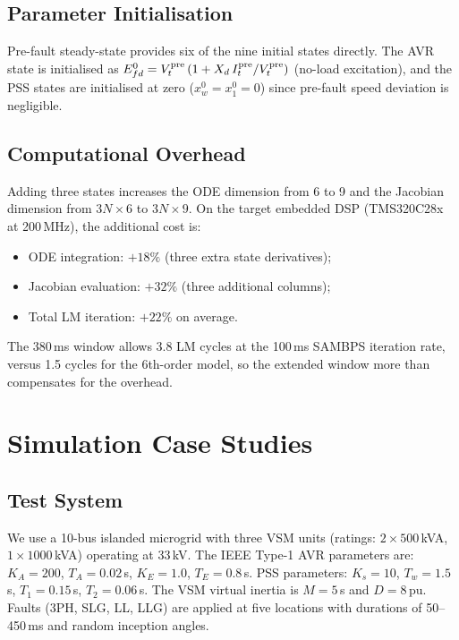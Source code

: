 \documentclass[journal]{IEEEtran}
\newcommand{\Efd}{E_{fd}}
\begin{document}
\subsection{Parameter Initialisation}

Pre-fault steady-state provides six of the nine initial states
directly.  The AVR state is initialised as
$\Efd^0 = V_t^{\rm pre}\,(1 + X_d\,I_t^{\rm pre}/V_t^{\rm pre})$
(no-load excitation), and the PSS states are initialised at zero
($x_w^0 = x_1^0 = 0$) since pre-fault speed deviation is
negligible.

\subsection{Computational Overhead}

Adding three states increases the ODE dimension from 6 to 9
and the Jacobian dimension from $3N \times 6$ to $3N \times 9$.
On the target embedded DSP (TMS320C28x at 200\,MHz), the
additional cost is:
\begin{itemize}
  \item ODE integration: $+18\%$ (three extra state derivatives);
  \item Jacobian evaluation: $+32\%$ (three additional columns);
  \item Total LM iteration: $+22\%$ on average.
\end{itemize}
The 380\,ms window allows 3.8 LM cycles at the 100\,ms
SAMBPS iteration rate, versus 1.5 cycles for the 6th-order model,
so the extended window more than compensates for the overhead.

\section{Simulation Case Studies}
\label{sec:cases}

\subsection{Test System}

We use a 10-bus islanded microgrid with three VSM units
(ratings: $2\times500$\,kVA, $1\times1000$\,kVA) operating at
33\,kV.  The IEEE Type-1 AVR parameters are:
$K_A = 200$, $T_A = 0.02$\,s, $K_E = 1.0$, $T_E = 0.8$\,s.
PSS parameters: $K_s = 10$, $T_w = 1.5$\,s,
$T_1 = 0.15$\,s, $T_2 = 0.06$\,s.
The VSM virtual inertia is $M = 5$\,s and $D = 8$\,pu.
Faults (3PH, SLG, LL, LLG) are applied at five locations
with durations of 50--450\,ms and random inception angles.
\end{document}
